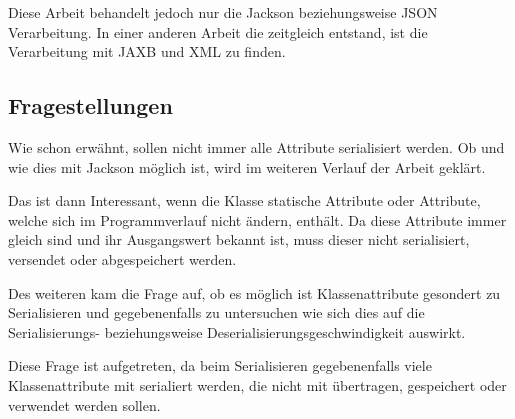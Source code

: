 Diese Arbeit behandelt jedoch nur die Jackson beziehungsweise \ac{JSON} Verarbeitung. In einer anderen Arbeit die zeitgleich entstand, ist die Verarbeitung mit \ac{JAXB} und XML zu finden. \cite{Wal14} 

\subsection{Fragestellungen}
Wie schon erw\"ahnt, sollen nicht immer alle Attribute serialisiert werden. Ob und wie dies mit Jackson m\"oglich ist, wird im weiteren Verlauf der Arbeit gekl\"art. 

Das ist dann Interessant, wenn die Klasse statische Attribute oder Attribute, welche sich im Programmverlauf nicht \"andern, enth\"alt. Da diese Attribute immer gleich sind und ihr Ausgangswert bekannt ist, muss dieser nicht serialisiert, versendet oder abgespeichert werden.

Des weiteren kam die Frage auf, ob es m\"oglich ist Klassenattribute gesondert zu Serialisieren und gegebenenfalls zu untersuchen wie sich dies auf die Serialisierungs- beziehungsweise Deserialisierungsgeschwindigkeit auswirkt.

Diese Frage ist aufgetreten, da beim Serialisieren gegebenenfalls viele Klassenattribute mit serialiert werden, die nicht mit \"ubertragen, gespeichert oder verwendet werden sollen. 